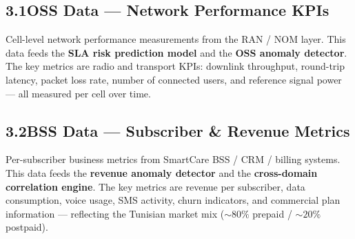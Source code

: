 \documentclass[12pt,a4paper]{article}
\begin{document}
\subsection*{3.1\quad OSS Data — Network Performance KPIs}

Cell-level network performance measurements from the RAN / NOM layer. This data feeds the \textbf{SLA risk prediction model} and the \textbf{OSS anomaly detector}. The key metrics are radio and transport KPIs: downlink throughput, round-trip latency, packet loss rate, number of connected users, and reference signal power — all measured per cell over time.

\subsection*{3.2\quad BSS Data — Subscriber \& Revenue Metrics}

Per-subscriber business metrics from SmartCare BSS / CRM / billing systems. This data feeds the \textbf{revenue anomaly detector} and the \textbf{cross-domain correlation engine}. The key metrics are revenue per subscriber, data consumption, voice usage, SMS activity, churn indicators, and commercial plan information — reflecting the Tunisian market mix (${\sim}80\%$ prepaid / ${\sim}20\%$ postpaid).
\end{document}

